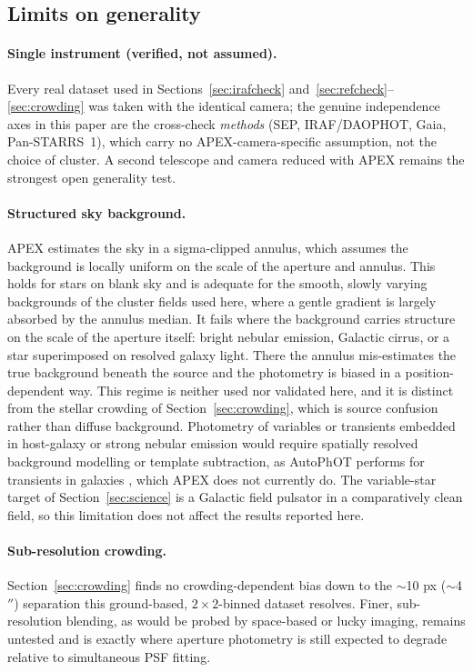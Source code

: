 \documentclass[fleqn,usenatbib]{mnras}
\begin{document}
\subsection{Limits on generality}
\label{sec:generality}

\paragraph*{Single instrument (verified, not assumed).} Every real dataset used in Sections~\ref{sec:irafcheck} and~\ref{sec:refcheck}--\ref{sec:crowding} was taken with the identical camera; the genuine independence axes in this paper are the cross-check \emph{methods} (SEP, IRAF/DAOPHOT, Gaia, Pan-STARRS~1), which carry no APEX-camera-specific assumption, not the choice of cluster. A second telescope and camera reduced with APEX remains the strongest open generality test.

\paragraph*{Structured sky background.} APEX estimates the sky in a sigma-clipped annulus, which assumes the background is locally uniform on the scale of the aperture and annulus. This holds for stars on blank sky and is adequate for the smooth, slowly varying backgrounds of the cluster fields used here, where a gentle gradient is largely absorbed by the annulus median. It fails where the background carries structure on the scale of the aperture itself: bright nebular emission, Galactic cirrus, or a star superimposed on resolved galaxy light. There the annulus mis-estimates the true background beneath the source and the photometry is biased in a position-dependent way. This regime is neither used nor validated here, and it is distinct from the stellar crowding of Section~\ref{sec:crowding}, which is source confusion rather than diffuse background. Photometry of variables or transients embedded in host-galaxy or strong nebular emission would require spatially resolved background modelling or template subtraction, as AutoPhOT performs for transients in galaxies \citep{brennan2022}, which APEX does not currently do. The variable-star target of Section~\ref{sec:science} is a Galactic field pulsator in a comparatively clean field, so this limitation does not affect the results reported here.

\paragraph*{Sub-resolution crowding.} Section~\ref{sec:crowding} finds no crowding-dependent bias down to the $\sim$10 px ($\sim$4$''$) separation this ground-based, $2\times2$-binned dataset resolves. Finer, sub-resolution blending, as would be probed by space-based or lucky imaging, remains untested and is exactly where aperture photometry is still expected to degrade relative to simultaneous PSF fitting.
\end{document}
